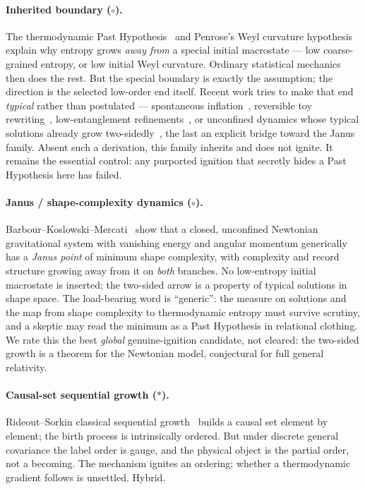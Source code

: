\documentclass[11pt]{article}
\begin{document}
\paragraph{Inherited boundary ($\circ$).} The thermodynamic Past
Hypothesis~\cite{albert,carrollchen} and Penrose's Weyl curvature
hypothesis~\cite{penrose,clifton} explain why entropy grows \emph{away from} a
special initial macrostate --- low coarse-grained entropy, or low initial Weyl
curvature. Ordinary statistical mechanics then does the rest. But the special
boundary is exactly the assumption; the direction is the selected low-order end
itself. Recent work tries to make that end \emph{typical} rather than postulated
--- spontaneous inflation~\cite{carrollchen}, reversible toy
rewriting~\cite{arrighi}, low-entanglement refinements~\cite{alkhalilichen}, or
unconfined dynamics whose typical solutions already grow
two-sidedly~\cite{lazarovici}, the last an explicit bridge toward the Janus
family. Absent such a derivation, this family inherits and does not ignite. It
remains the essential control: any purported ignition that secretly hides a Past
Hypothesis here has failed.

\paragraph{Janus / shape-complexity dynamics ($\circ$).}
Barbour--Koslowski--Mercati~\cite{bkm13,bkm14,bkm16} show that a closed,
unconfined Newtonian gravitational system with vanishing energy and angular
momentum generically has a \emph{Janus point} of minimum shape complexity, with
complexity and record structure growing away from it on \emph{both} branches. No
low-entropy initial macrostate is inserted; the two-sided arrow is a property of
typical solutions in shape space. The load-bearing word is ``generic'': the
measure on solutions and the map from shape complexity to thermodynamic entropy
must survive scrutiny, and a skeptic may read the minimum as a Past Hypothesis in
relational clothing. We rate this the best \emph{global} genuine-ignition
candidate, not cleared: the two-sided growth is a theorem for the Newtonian
model, conjectural for full general relativity.

\paragraph{Causal-set sequential growth ($\ast$).} Rideout--Sorkin classical
sequential growth~\cite{rideout} builds a causal set element by element; the
birth process is intrinsically ordered. But under discrete general covariance the
label order is gauge, and the physical object is the partial order, not a
becoming. The mechanism ignites an ordering; whether a thermodynamic gradient
follows is unsettled. Hybrid.
\end{document}

